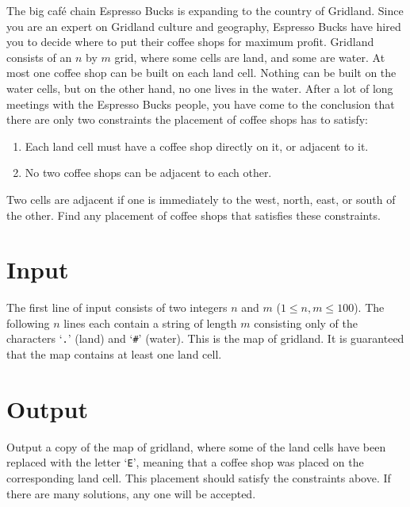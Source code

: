 
%
\noindent
The big café chain Espresso Bucks is expanding to the country of Gridland. Since you are an expert on Gridland culture and geography, Espresso Bucks have hired you to decide where to put their coffee shops for maximum profit. Gridland consists of an $n$ by $m$ grid, where some cells are land, and some are water. At most one coffee shop can be built on each land cell. Nothing can be built on the water cells, but on the other hand, no one lives in the water. After a lot of long meetings with the Espresso Bucks people, you have come to the conclusion that there are only two constraints the placement of coffee shops has to satisfy:

\begin{enumerate}

\item Each land cell must have a coffee shop directly on it, or adjacent to it.

\item No two coffee shops can be adjacent to each other.

\end{enumerate}

\noindent
Two cells are adjacent if one is immediately to the west, north, east, or south of the other. Find any placement of coffee shops that satisfies these constraints.

\section*{Input}
The first line of input consists of two integers $n$ and $m$ ($1 \leq n,m \leq 100$). The following $n$ lines each contain a string of length $m$ consisting only of the characters `\texttt{.}' (land) and `\texttt{\#}' (water). This is the map of gridland.
It is guaranteed that the map contains at least one land cell.

\section*{Output}

Output a copy of the map of gridland, where some of the land cells have been replaced with the letter `\texttt{E}', meaning that a coffee shop was placed on the corresponding land cell. This placement should satisfy the constraints above.  If there are many solutions, any one will be accepted.
